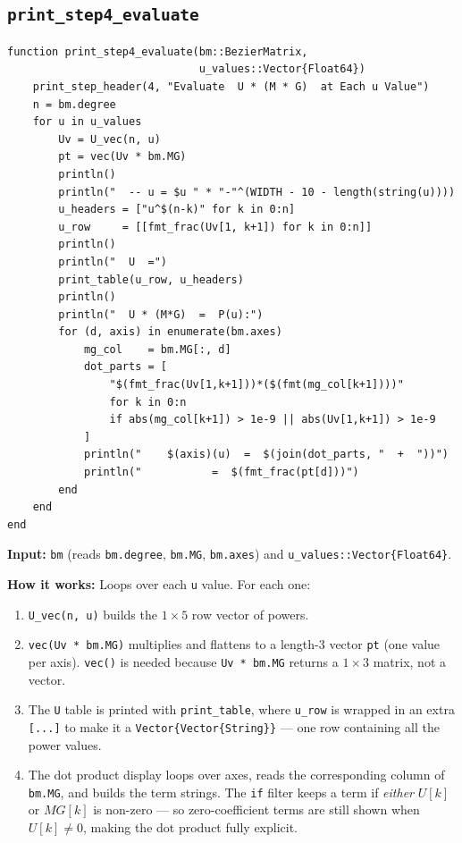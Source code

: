 \documentclass[12pt, a4paper]{article}
\newcommand{\cd}[1]{\texttt{#1}}
\begin{document}
\subsection{\texttt{print\_step4\_evaluate}}

\begin{verbatim}
function print_step4_evaluate(bm::BezierMatrix,
                              u_values::Vector{Float64})
    print_step_header(4, "Evaluate  U * (M * G)  at Each u Value")
    n = bm.degree
    for u in u_values
        Uv = U_vec(n, u)
        pt = vec(Uv * bm.MG)
        println()
        println("  -- u = $u " * "-"^(WIDTH - 10 - length(string(u))))
        u_headers = ["u^$(n-k)" for k in 0:n]
        u_row     = [[fmt_frac(Uv[1, k+1]) for k in 0:n]]
        println()
        println("  U  =")
        print_table(u_row, u_headers)
        println()
        println("  U * (M*G)  =  P(u):")
        for (d, axis) in enumerate(bm.axes)
            mg_col    = bm.MG[:, d]
            dot_parts = [
                "$(fmt_frac(Uv[1,k+1]))*($(fmt(mg_col[k+1])))"
                for k in 0:n
                if abs(mg_col[k+1]) > 1e-9 || abs(Uv[1,k+1]) > 1e-9
            ]
            println("    $(axis)(u)  =  $(join(dot_parts, "  +  "))")
            println("           =  $(fmt_frac(pt[d]))")
        end
    end
end
\end{verbatim}

\textbf{Input:} \cd{bm} (reads \cd{bm.degree}, \cd{bm.MG},
\cd{bm.axes}) and \cd{u\_values::Vector\{Float64\}}.

\textbf{How it works:}
Loops over each \cd{u} value.
For each one:

\begin{enumerate}
  \item \cd{U\_vec(n, u)} builds the $1 \times 5$ row vector
        of powers.
  \item \cd{vec(Uv * bm.MG)} multiplies and flattens to a
        length-3 vector \cd{pt} (one value per axis).
        \cd{vec()} is needed because \cd{Uv * bm.MG}
        returns a $1 \times 3$ matrix, not a vector.
  \item The \cd{U} table is printed with \cd{print\_table},
        where \cd{u\_row} is wrapped in an extra
        \cd{[...]} to make it a \cd{Vector\{Vector\{String\}\}}
        --- one row containing all the power values.
  \item The dot product display loops over axes,
        reads the corresponding column of \cd{bm.MG},
        and builds the term strings.
        The \cd{if} filter keeps a term if \emph{either}
        $U[k]$ or $MG[k]$ is non-zero --- so zero-coefficient
        terms are still shown when $U[k] \neq 0$,
        making the dot product fully explicit.
\end{enumerate}
\end{document}
